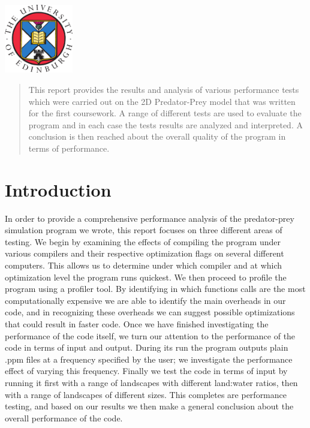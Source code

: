 \begin{titlepage}
\includegraphics[width=3cm, height=3cm]{logo.png}\\[3cm] %
 

\vfill %

\end{titlepage}

\begin{abstract}
This report provides the results and analysis of various performance tests which were carried out on the 2D Predator-Prey model that was written for the first coursework. A range of different tests are used to evaluate the program and in each case the tests results are analyzed and interpreted. A conclusion is then reached about the overall quality of the program in terms of performance. 
\end{abstract}
\listoffigures
\listoftables
\tableofcontents

\section{Introduction}
\label{sec:introduction}
In order to provide a comprehensive performance analysis of the predator-prey simulation program we wrote, this report focuses on three different areas of testing. We begin by examining the effects of compiling the program under various compilers and their respective optimization flags on several different computers. This allows us to determine under which compiler and at which optimization level the program runs quickest. We then proceed to profile the program using a profiler tool. By identifying in which functions calls are the most computationally expensive we are able to identify the main overheads in our code, and in recognizing these overheads we can suggest possible optimizations that could result in faster code. Once we have finished investigating the performance of the code itself, we turn our attention to the performance of the code in terms of input and output. During its run the program outputs plain .ppm files at a frequency specified by the user; we investigate the performance effect of varying this frequency. Finally we test the code in terms of input by running it first with a range of landscapes with different land:water ratios, then with a range of landscapes of different sizes. This completes are performance testing, and based on our results we then make a general conclusion about the overall performance of the code.\\


